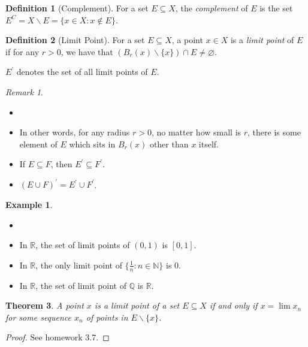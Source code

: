 \documentclass[12pt, lettersize]{book}
\theoremstyle{plain}
\newtheorem{thm}{Theorem}[section]
\theoremstyle{definition}
\newtheorem{dfn}[thm]{Definition}
\newtheorem*{eg}{Example}
\theoremstyle{remark}
\newtheorem*{rem}{Remark}
\newcommand{\R}{\mathbb{R}}
\newcommand{\N}{\mathbb{N}}
\newcommand{\Q}{\mathbb{Q}}
\let\emptyset\varnothing
\begin{document}
		\begin{dfn}[Complement]
			For a set $E\subseteq X$, the \emph{complement} of $E$ is the set $E^C=X\backslash E=\{x\in X: x\notin E\}$.
		\end{dfn}
		
		\begin{dfn}[Limit Point]
			For a set $E\subseteq X$, a point $x\in X$ is a \emph{limit point} of $E$ if for any $r>0$, we have that $(B_r(x)\backslash\{x\})\cap E\neq\emptyset$.\smallskip
			
			$E^\prime$ denotes the set of all limit points of $E$.
		\end{dfn}
		\begin{rem}
			\begin{itemize}
				\item[]
				\item In other words, for any radius $r>0$, no matter how small is $r$, there is some element of $E$ which sits in $B_r(x)$ other than $x$ itself. 
				\item If $E\subseteq F$, then $E^\prime\subseteq F^\prime$.
				\item $(E\cup F)^\prime=E^\prime\cup F^\prime$.
			\end{itemize}
		\end{rem}
		\begin{eg}
			\begin{itemize}
				\item[]
				\item In $\R$, the set of limit points of $(0,1)$ is $[0,1]$.
				\item In $\R$, the only limit point of $\{\frac{1}{n}: n\in\N\}$ is $0$.
				\item In $\R$, the set of limit point of $\Q$ is $\R$. 
			\end{itemize}
		\end{eg}
		
		\begin{thm}
			A point $x$ is a limit point of a set $E\subseteq X$ if and only if $x=\lim x_n$ for some sequence $x_n$ of points in $E\backslash\{x\}$. 
		\end{thm}
		\begin{proof}
			See homework 3.7.
		\end{proof}
		
\end{document}
